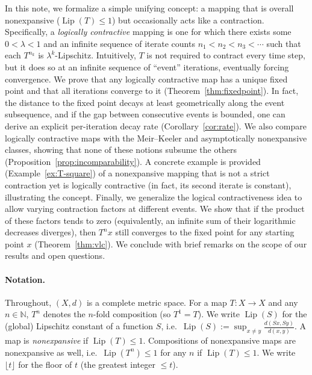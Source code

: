\documentclass[11pt]{article}
\theoremstyle{definition}
\theoremstyle{remark}
\DeclareMathOperator{\Lip}{Lip}
\begin{document}
In this note, we formalize a simple unifying concept: a mapping that is overall nonexpansive ($\Lip(T)\le 1$) but occasionally acts like a contraction. Specifically, a \textit{logically contractive} mapping is one for which there exists some $0<\lambda<1$ and an infinite sequence of iterate counts $n_1 < n_2 < n_3 < \cdots$ such that each $T^{n_k}$ is $\lambda^k$-Lipschitz. Intuitively, $T$ is not required to contract every time step, but it does so at an infinite sequence of ``event'' iterations, eventually forcing convergence. We prove that any logically contractive map has a unique fixed point and that all iterations converge to it (Theorem~\ref{thm:fixedpoint}). In fact, the distance to the fixed point decays at least geometrically along the event subsequence, and if the gap between consecutive events is bounded, one can derive an explicit per-iteration decay rate (Corollary~\ref{cor:rate}). We also compare logically contractive maps with the Meir--Keeler and asymptotically nonexpansive classes, showing that none of these notions subsume the others (Proposition~\ref{prop:incomparability}). A concrete example is provided (Example~\ref{ex:T-square}) of a nonexpansive mapping that is not a strict contraction yet is logically contractive (in fact, its second iterate is constant), illustrating the concept. Finally, we generalize the logical contractiveness idea to allow varying contraction factors at different events. We show that if the product of these factors tends to zero (equivalently, an infinite sum of their logarithmic decreases diverges), then $T^n x$ still converges to the fixed point for any starting point $x$ (Theorem~\ref{thm:vlc}). We conclude with brief remarks on the scope of our results and open questions.

\paragraph{Notation.} Throughout, $(X,d)$ is a complete metric space. For a map $T:X\to X$ and any $n\in \mathbb{N}$, $T^n$ denotes the $n$-fold composition (so $T^1=T$). We write $\Lip(S)$ for the (global) Lipschitz constant of a function $S$, i.e.\ $\Lip(S) := \sup_{x\neq y} \frac{d(Sx,Sy)}{d(x,y)}$. A map is \emph{nonexpansive} if $\Lip(T)\le 1$. Compositions of nonexpansive maps are nonexpansive as well, i.e.\ $\Lip(T^n)\le 1$ for any $n$ if $\Lip(T)\le 1$. We write $\lfloor t\rfloor$ for the floor of $t$ (the greatest integer $\le t$).
\end{document}
